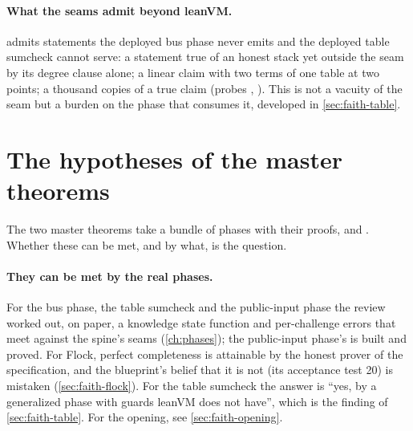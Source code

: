 \paragraph{What the seams admit beyond leanVM.}  admits statements the deployed
bus phase never emits and the deployed table sumcheck cannot serve: a statement true of an
honest stack yet outside the seam by its degree clause alone; a linear claim with two terms of
one table at two points; a thousand copies of a true claim (probes ,
). This is not a vacuity of the seam but a burden on the phase that
consumes it, developed in \cref{sec:faith-table}.

\section{The hypotheses of the master theorems}\label{sec:nv-hypotheses}

The two master theorems take a bundle of phases with their proofs,  and
. Whether these can be met, and by what, is the question.

\paragraph{They can be met by the real phases.} For the bus phase, the table sumcheck and the
public-input phase the review worked out, on paper, a knowledge state function and per-challenge
errors that meet  against the spine's seams (\cref{ch:phases}); the
public-input phase's is built and proved. For Flock, perfect completeness is attainable by the
honest prover of the specification, and the blueprint's belief that it is not (its acceptance
test 20) is mistaken (\cref{sec:faith-flock}). For the table sumcheck the answer is
\enquote{yes, by a generalized phase with guards leanVM does not have}, which is the finding of
\cref{sec:faith-table}. For the opening, see \cref{sec:faith-opening}.

